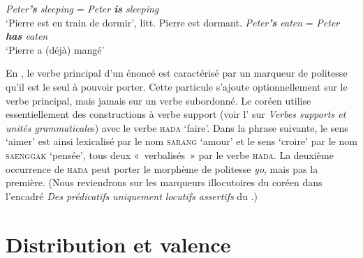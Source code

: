 {    \ea
      \ea \textit{{Peter}\textbf{{’s}}  {sleeping}} =  \textit{{Peter} \textbf{{is}}  {sleeping}} \\\glt ‘Pierre est en train de dormir’, litt. Pierre est dormant.
      \ex \textit{{Peter}\textbf{{’s}}  {eaten}}   =   \textit{{Peter} \textbf{{has}}  {eaten}}  \\\glt ‘Pierre a (déjà) mangé’
        \z
    \z
   
   En , le verbe principal d’un énoncé est caractérisé par un marqueur de politesse qu’il est le seul à pouvoir porter. Cette particule s’ajoute optionnellement sur le verbe principal, mais jamais sur un verbe subordonné. Le coréen utilise essentiellement des constructions à verbe support (voir l' sur \textit{Verbes supports et unités grammaticale}s) avec le verbe \textsc{hada} ‘faire’. Dans la phrase suivante, le sens ‘aimer’ est ainsi lexicalisé par le nom \textsc{sarang} ‘amour’ et le sens ‘croire’ par le nom \textsc{saenggak} ‘pensée’, tous deux «~verbalisés~» par le verbe \textsc{hada}. La deuxième occurrence de \textsc{hada} peut porter le morphème de politesse \textit{yo}, mais pas la première. (Nous reviendrons sur les marqueurs illocutoires du coréen dans l’encadré \textit{Des prédicatifs uniquement locutifs assertifs} du .)

    \ea \let\eachwordone\cjkfont
    \z
    \z
}
\section{Distribution et valence}\label{sec:3.3.10}

